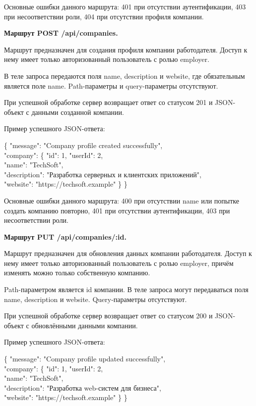 Основные ошибки данного маршрута: 401 при отсутствии аутентификации, 403 при несоответствии роли, 404 при отсутствии профиля компании.

\textbf{Маршрут POST /api/companies.}

Маршрут предназначен для создания профиля компании работодателя. Доступ к нему имеет только авторизованный пользователь с ролью employer.

В теле запроса передаются поля name, description и website, где обязательным является поле name. Path-параметры и query-параметры отсутствуют.

При успешной обработке сервер возвращает ответ со статусом 201 и JSON-объект с данными созданной компании.

Пример успешного JSON-ответа:

\begin{flushleft}
	\small\ttfamily
	\{ "message": "Company profile created successfully",\\
	"company": \{ "id": 1, "userId": 2,\\
	"name": "TechSoft",\\
	"description": "Разработка серверных и клиентских приложений",\\
	"website": "https://techsoft.example" \} \}
\end{flushleft}

Основные ошибки данного маршрута: 400 при отсутствии name или попытке создать компанию повторно, 401 при отсутствии аутентификации, 403 при несоответствии роли.

\textbf{Маршрут PUT /api/companies/:id.}

Маршрут предназначен для обновления данных компании работодателя. Доступ к нему имеет только авторизованный пользователь с ролью employer, причём изменять можно только собственную компанию.

Path-параметром является id компании. В теле запроса могут передаваться поля name, description и website. Query-параметры отсутствуют.

При успешной обработке сервер возвращает ответ со статусом 200 и JSON-объект с обновлёнными данными компании.

Пример успешного JSON-ответа:

\begin{flushleft}
	\small\ttfamily
	\{ "message": "Company profile updated successfully",\\
	"company": \{ "id": 1, "userId": 2,\\
	"name": "TechSoft",\\
	"description": "Разработка web-систем для бизнеса",\\
	"website": "https://techsoft.example" \} \}
\end{flushleft}

